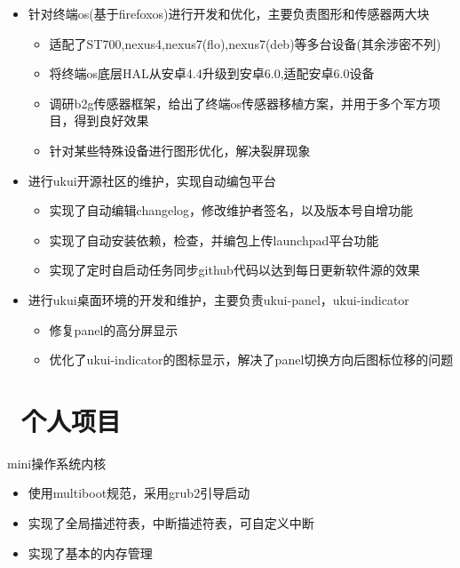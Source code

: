 \documentclass{resume}
\begin{document}
\begin{itemize}
  \item 针对终端os(基于firefoxos)进行开发和优化，主要负责图形和传感器两大块
    \begin{itemize}
      \item 适配了ST700,nexus4,nexus7(flo),nexus7(deb)等多台设备(其余涉密不列)
      \item 将终端os底层HAL从安卓4.4升级到安卓6.0,适配安卓6.0设备
      \item 调研b2g传感器框架，给出了终端os传感器移植方案，并用于多个军方项目，得到良好效果
      \item 针对某些特殊设备进行图形优化，解决裂屏现象  
    \end{itemize} 
  
  \item 进行ukui开源社区的维护，实现自动编包平台
  \begin{itemize}
    \item 实现了自动编辑changelog，修改维护者签名，以及版本号自增功能
    \item 实现了自动安装依赖，检查，并编包上传launchpad平台功能
    \item 实现了定时自启动任务同步github代码以达到每日更新软件源的效果
  \end{itemize}

  \item 进行ukui桌面环境的开发和维护，主要负责ukui-panel，ukui-indicator
    \begin{itemize}
      \item 修复panel的高分屏显示
      \item 优化了ukui-indicator的图标显示，解决了panel切换方向后图标位移的问题
    \end{itemize}
\end{itemize} 

\section{\faGithubAlt\ 个人项目}

mini操作系统内核
\begin{itemize}
  \item 使用multiboot规范，采用grub2引导启动
  \item 实现了全局描述符表，中断描述符表，可自定义中断
  \item 实现了基本的内存管理
\end{itemize}
\end{document}
